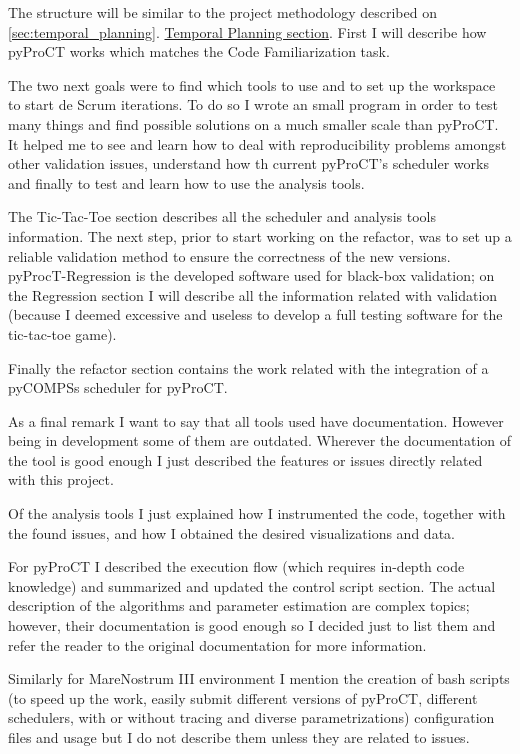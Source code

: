 The structure will be similar to the project methodology described on \ref{sec:temporal_planning}. \hyperref[sec:temporal_planning]{Temporal Planning section}. First I will describe how pyProCT works which matches the Code Familiarization task. 

The two next goals were to find which tools to use and to set up the workspace to start de Scrum iterations. To do so I wrote an small program in order to test many things and find possible solutions on a much smaller scale than pyProCT. It helped me to see and learn how to deal with reproducibility problems amongst other validation issues, understand how th current pyProCT's scheduler works and finally to test and learn how to use the analysis tools. 

The Tic-Tac-Toe section describes all the scheduler and analysis tools information. The next step, prior to start working on the refactor, was to set up a reliable validation method to ensure the correctness of the new versions. pyProcT-Regression is the developed software used for black-box validation; on the  Regression section I will describe all the information related with validation (because I deemed excessive and useless to develop a full testing software for the tic-tac-toe game).

Finally the refactor section contains the work related with the integration of a pyCOMPSs scheduler for pyProCT. 

As a final remark I want to say that all tools used have documentation. However being in development some of them are outdated. Wherever the documentation of the tool is good enough I just described the features or issues directly related with this project. 

Of the analysis tools I just explained how I instrumented the code, together with the found issues, and how I obtained the desired visualizations and data.

For pyProCT I described the execution flow (which requires in-depth code knowledge) and summarized and updated the control script section. The actual description of the algorithms and parameter estimation are complex topics; however, their documentation is good enough so I decided just to list them and refer the reader to the original documentation for more information.

Similarly for MareNostrum III environment I mention the creation of bash scripts (to speed up the work, easily submit different versions of pyProCT, different schedulers, with or without tracing and diverse parametrizations) configuration files and usage but I do not describe them unless they are related to issues.

